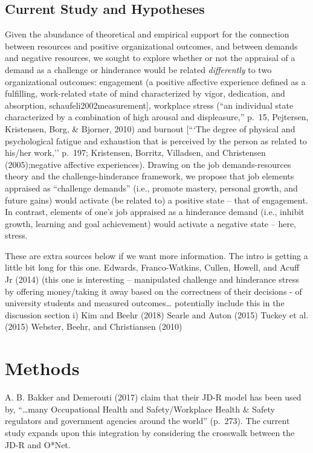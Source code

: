 \documentclass[
  english,
  man]{apa6}
\begin{document}
\hypertarget{current-study-and-hypotheses-1}{%
\subsection{Current Study and Hypotheses}\label{current-study-and-hypotheses-1}}

Given the abundance of theoretical and empirical support for the connection between resources and positive organizational outcomes, and between demands and negative resources, we sought to explore whether or not the appraisal of a demand as a challenge or hinderance would be related \emph{differently} to two organizational outcomes: engagement (a positive affective experience defined as a fulfilling, work-related state of mind characterized by vigor, dedication, and absorption, schaufeli2002measurement{]}, workplace stress ({``an individual state characterized by a combination of high arousal and displeasure,''} p.~15, Pejtersen, Kristensen, Borg, \& Bjorner, 2010) and burnout {[}```The degree of physical and psychological fatigue and exhaustion that is perceived by the person as related to his/her work,'' p.~197; Kristensen, Borritz, Villadsen, and Christensen (2005);negative affective experiences). Drawing on the job demands-resources theory and the challenge-hinderance framework, we propose that job elements appraised as ``challenge demands'' (i.e., promote mastery, personal growth, and future gains) would activate (be related to) a positive state -- that of engagement. In contrast, elements of one's job appraised as a hinderance demand (i.e., inhibit growth, learning and goal achievement) would activate a negative state -- here, stress.

These are extra sources below if we want more information. The intro is getting a little bit long for this one.
Edwards, Franco-Watkins, Cullen, Howell, and Acuff Jr (2014) (this one is interesting -- manipulated challenge and hinderance stress by offering money/taking it away based on the correctness of their decisions - of university students and measured outcomes\ldots{} potentially include this in the discussion section i)
Kim and Beehr (2018)
Searle and Auton (2015)
Tuckey et al. (2015)
Webster, Beehr, and Christiansen (2010)

\hypertarget{methods}{%
\section{Methods}\label{methods}}

A. B. Bakker and Demerouti (2017) claim that their JD-R model has been used by, ``\ldots many Occupational Health and Safety/Workplace Health \& Safety regulators and government agencies around the world'' (p.~273). The current study expands upon this integration by considering the crosswalk between the JD-R and O*Net.
\end{document}
